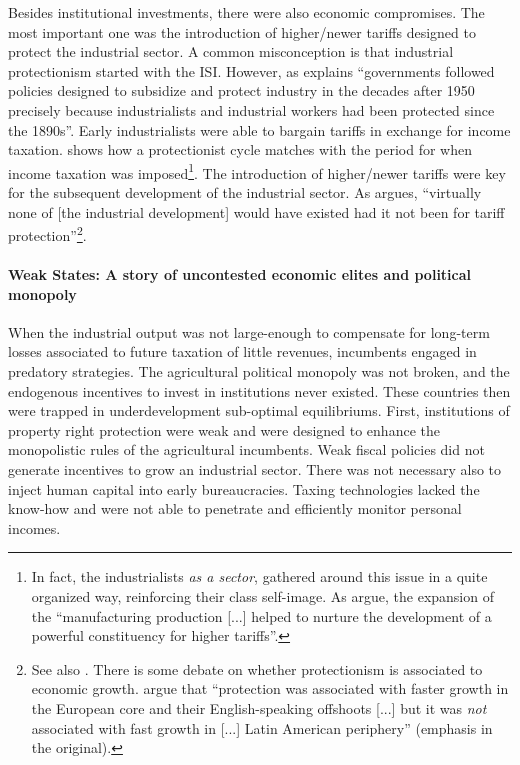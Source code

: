 \documentclass[onesided]{article}\usepackage[]{graphicx}\usepackage[]{color}
\begin{document}
Besides institutional investments, there were also economic compromises. The most important one was the introduction of higher/newer tariffs designed to protect the industrial sector. A common misconception is that industrial protectionism started with the ISI. However, as \citet[p. 3-4]{Haber2005} explains ``governments followed policies designed to subsidize and protect industry in the decades after 1950 precisely because industrialists and industrial workers had been protected since the 1890s''. Early industrialists were able to bargain tariffs in exchange for income taxation. \citet[p. 53]{Lederman2005} shows how a protectionist cycle matches with the period for when income taxation was imposed\footnote{
	In fact, the industrialists \emph{as a sector}, gathered around this issue in a quite organized way, reinforcing their class self-image. As \citet[p. 122]{Sokoloff2007a} argue, the expansion of the ``manufacturing production [...] helped to nurture the development of a powerful constituency for higher tariffs''.
}. The introduction of higher/newer tariffs were key for the subsequent development of the industrial sector. As \citet[p. 15]{Haber2005} argues, ``virtually none of [the industrial development] would have existed had it not been for tariff protection''\footnote{
	See also \citet[p. 21]{Coatsworth2002}. There is some debate on whether protectionism is associated to economic growth. \citet[p. 10]{Coatsworth2002} argue that ``protection was associated with faster growth in the European core and their English-speaking offshoots [...] but it was \emph{not} associated with fast growth in [...] Latin American periphery'' (emphasis in the original).
}. 

\paragraph{Weak States: A story of uncontested economic elites and political monopoly} When the industrial output was not large-enough to compensate for long-term losses associated to future taxation of little revenues, incumbents engaged in predatory strategies. The agricultural political monopoly was not broken, and the endogenous incentives to invest in institutions never existed. These countries then were trapped in underdevelopment sub-optimal equilibriums. First, institutions of property right protection were weak and were designed to enhance the monopolistic rules of the agricultural incumbents. Weak fiscal policies did not generate incentives to grow an industrial sector. There was not necessary also to inject human capital into  early bureaucracies. Taxing technologies lacked the know-how and were not able to penetrate and efficiently monitor personal incomes. 
\end{document}
